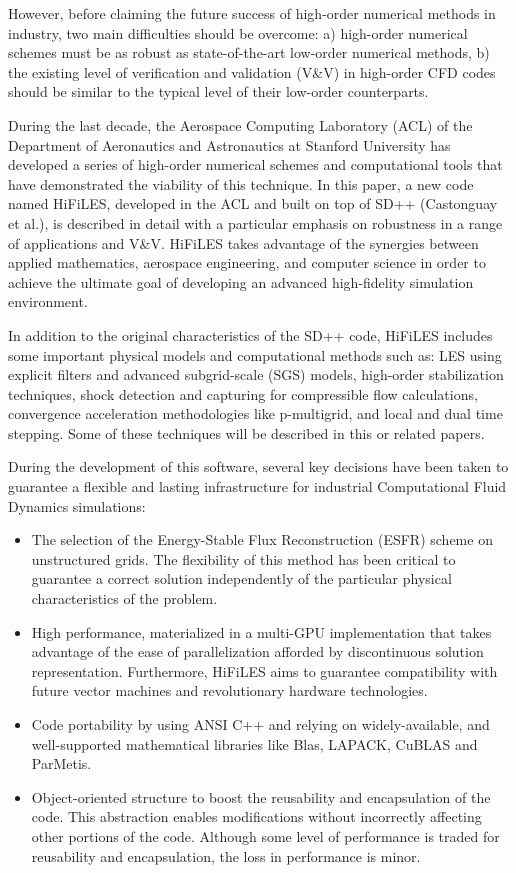 However, before claiming the future success of high-order numerical methods in industry, two main difficulties should be overcome: a) high-order numerical schemes must be as robust as state-of-the-art low-order numerical methods, b) the existing level of verification and validation (V\&V) in high-order CFD codes should be similar to the typical level of their low-order counterparts.

During the last decade, the Aerospace Computing Laboratory (ACL) of the Department of Aeronautics and Astronautics at Stanford University has developed a series of high-order numerical schemes and computational tools that have demonstrated the viability of this technique. In this paper, a new code named HiFiLES, developed in the ACL and built on top of SD++ (Castonguay et al.\cite{castonguay2011}), is described in detail with a particular emphasis on robustness in a range of applications and V\&V. HiFiLES takes advantage of the synergies between applied mathematics, aerospace engineering, and computer science in order to achieve the ultimate goal of developing an advanced high-fidelity simulation environment.

In addition to the original characteristics of the SD++ code, HiFiLES includes some important physical models and computational methods such as: LES using explicit filters and advanced subgrid-scale (SGS) models, high-order stabilization techniques, shock detection and capturing for compressible flow calculations, convergence acceleration methodologies like p-multigrid, and local and dual time stepping. Some of these techniques will be described in this or related papers.

During the development of this software, several key decisions have been taken to guarantee a flexible and lasting infrastructure for industrial Computational Fluid Dynamics simulations:
\begin{itemize}
\item The selection of the Energy-Stable Flux Reconstruction (ESFR) scheme on unstructured grids. The flexibility of this method has been critical to guarantee a correct solution independently of the particular physical characteristics of the problem.
\item High performance, materialized in a multi-GPU implementation that takes advantage of the ease of parallelization afforded by discontinuous solution representation. Furthermore, HiFiLES aims to guarantee compatibility with future vector machines and revolutionary hardware technologies.
\item Code portability by using ANSI C++ and relying on widely-available, and well-supported mathematical libraries like Blas, LAPACK, CuBLAS and ParMetis.
\item Object-oriented structure to boost the reusability and encapsulation of the code. This abstraction enables modifications without incorrectly affecting other portions of the code. Although some level of performance is traded for reusability and encapsulation, the loss in performance is minor.
\end{itemize}

